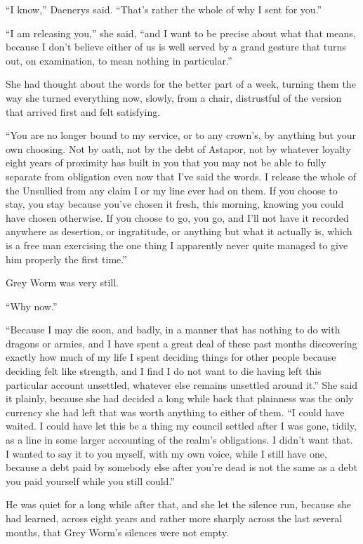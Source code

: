 “I know,” Daenerys said. “That’s rather the whole of why I sent for you.”

\sceneBreak

“I am releasing you,” she said, “and I want to be precise about what that means, because I don’t believe either of us is well served by a grand gesture that turns out, on examination, to mean nothing in particular.”

She had thought about the words for the better part of a week, turning them the way she turned everything now, slowly, from a chair, distrustful of the version that arrived first and felt satisfying.

“You are no longer bound to my service, or to any crown’s, by anything but your own choosing. Not by oath, not by the debt of Astapor, not by whatever loyalty eight years of proximity has built in you that you may not be able to fully separate from obligation even now that I’ve said the words. I release the whole of the Unsullied from any claim I or my line ever had on them. If you choose to stay, you stay because you’ve chosen it fresh, this morning, knowing you could have chosen otherwise. If you choose to go, you go, and I’ll not have it recorded anywhere as desertion, or ingratitude, or anything but what it actually is, which is a free man exercising the one thing I apparently never quite managed to give him properly the first time.”

Grey Worm was very still.

“Why now.”

“Because I may die soon, and badly, in a manner that has nothing to do with dragons or armies, and I have spent a great deal of these past months discovering exactly how much of my life I spent deciding things for other people because deciding felt like strength, and I find I do not want to die having left this particular account unsettled, whatever else remains unsettled around it.” She said it plainly, because she had decided a long while back that plainness was the only currency she had left that was worth anything to either of them. “I could have waited. I could have let this be a thing my council settled after I was gone, tidily, as a line in some larger accounting of the realm’s obligations. I didn’t want that. I wanted to say it to you myself, with my own voice, while I still have one, because a debt paid by somebody else after you’re dead is not the same as a debt you paid yourself while you still could.”

\sceneBreak

He was quiet for a long while after that, and she let the silence run, because she had learned, across eight years and rather more sharply across the last several months, that Grey Worm’s silences were not empty.

